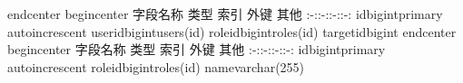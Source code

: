 {}\markdownRendererBackslash{}end\markdownRendererLeftBrace{}center\markdownRendererRightBrace{}\markdownRendererInterblockSeparator
{}\markdownRendererInterblockSeparator
{}\markdownRendererBackslash{}begin\markdownRendererLeftBrace{}center\markdownRendererRightBrace{}\markdownRendererInterblockSeparator
{}\markdownRendererPipe{} 字段名称 \markdownRendererPipe{} 类型 \markdownRendererPipe{} 索引 \markdownRendererPipe{} 外键 \markdownRendererPipe{} 其他 \markdownRendererPipe{} \markdownRendererPipe{}:-:\markdownRendererPipe{}:-:\markdownRendererPipe{}:-:\markdownRendererPipe{}:-:\markdownRendererPipe{} \markdownRendererPipe{}id\markdownRendererPipe{}bigint\markdownRendererPipe{}primary\markdownRendererPipe{}\markdownRendererPipe{} auto\markdownRendererBackslash{}\markdownRendererUnderscore{}increscent\markdownRendererPipe{} \markdownRendererPipe{}user\markdownRendererBackslash{}\markdownRendererUnderscore{}id\markdownRendererPipe{}bigint\markdownRendererPipe{}\markdownRendererPipe{}users(id)\markdownRendererPipe{}\markdownRendererPipe{} \markdownRendererPipe{}role\markdownRendererBackslash{}\markdownRendererUnderscore{}id\markdownRendererPipe{}bigint\markdownRendererPipe{}\markdownRendererPipe{}roles(id)\markdownRendererPipe{}\markdownRendererPipe{} \markdownRendererPipe{}target\markdownRendererBackslash{}\markdownRendererUnderscore{}id\markdownRendererPipe{}bigint\markdownRendererPipe{}\markdownRendererPipe{}\markdownRendererPipe{}\markdownRendererPipe{}\markdownRendererInterblockSeparator
{}\markdownRendererBackslash{}end\markdownRendererLeftBrace{}center\markdownRendererRightBrace{}\markdownRendererInterblockSeparator
{}\markdownRendererInterblockSeparator
{}\markdownRendererBackslash{}begin\markdownRendererLeftBrace{}center\markdownRendererRightBrace{}\markdownRendererInterblockSeparator
{}\markdownRendererPipe{} 字段名称 \markdownRendererPipe{} 类型 \markdownRendererPipe{} 索引 \markdownRendererPipe{} 外键 \markdownRendererPipe{} 其他 \markdownRendererPipe{} \markdownRendererPipe{}:-:\markdownRendererPipe{}:-:\markdownRendererPipe{}:-:\markdownRendererPipe{}:-:\markdownRendererPipe{} \markdownRendererPipe{}id\markdownRendererPipe{}bigint\markdownRendererPipe{}primary\markdownRendererPipe{}\markdownRendererPipe{} auto\markdownRendererBackslash{}\markdownRendererUnderscore{}increscent\markdownRendererPipe{} \markdownRendererPipe{}role\markdownRendererBackslash{}\markdownRendererUnderscore{}id\markdownRendererPipe{}bigint\markdownRendererPipe{}\markdownRendererPipe{}roles(id)\markdownRendererPipe{}\markdownRendererPipe{} \markdownRendererPipe{}name\markdownRendererPipe{}varchar(255)\markdownRendererPipe{}\markdownRendererPipe{}\markdownRendererPipe{}\markdownRendererPipe{}\markdownRendererInterblockSeparator
